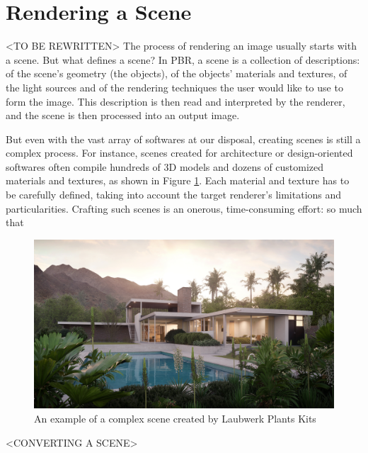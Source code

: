 \documentclass[cic,tc,english]{iiufrgs}
\begin{document}
\section{Rendering a Scene}
<TO BE REWRITTEN>
The process of rendering an image usually starts with a scene. But what defines 
a scene? In PBR, a scene is a collection of descriptions: of the scene's 
geometry (the objects), of the objects' materials and textures, of the light 
sources and of the rendering techniques the user would like to use to form the 
image. This description is then read and interpreted by the renderer, and the 
scene is then processed into an output image.

But even with the vast array of softwares at our disposal, creating scenes is 
still a complex process. For instance, scenes created for architecture or 
design-oriented softwares often compile hundreds of 3D models and dozens of 
customized materials and textures, as shown in Figure 
\ref{fig:intro_complexScene}. Each material and texture has to be carefully 
defined, taking into account the target 
renderer's limitations and particularities. Crafting such scenes is an onerous, 
time-consuming effort: so much that 

\begin{figure}[h]
  
\includegraphics[width=\textwidth,height=\textheight,keepaspectratio]{../images/1_introduction/Laubwerk-Kit-12_Bauclassroom-Exterior}
  \caption{An example of a complex scene created by Laubwerk Plants Kits}
  \label{fig:intro_complexScene}
\end{figure}

<CONVERTING A SCENE>
\end{document}
